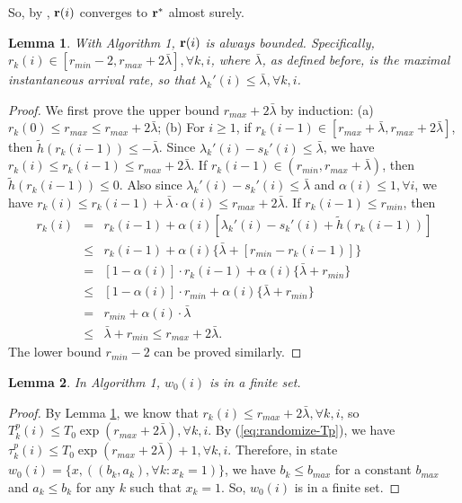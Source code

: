 \documentclass{IEEEtran}
\newtheorem{lemma}{Lemma}
\begin{document}
So, by \cite{Borkar}, ${\bf r}(i)$ converges to ${\bf r}^{*}$ almost
surely.
\begin{lemma}
\label{lem:r-bounded-Algorithm-4}With Algorithm 1, ${\bf r}(i)$
is always bounded. Specifically, $r_{k}(i)\in[r_{min}-2,r_{max}+2\bar{\lambda}],\forall k,i$,
where $\bar{\lambda}$, as defined before, is the maximal instantaneous
arrival rate, so that $\lambda_{k}'(i)\le\bar{\lambda},\forall k,i$. \end{lemma}
\begin{proof}
We first prove the upper bound $r_{max}+2\bar{\lambda}$ by induction:
(a) $r_{k}(0)\le r_{max}\le r_{max}+2\bar{\lambda}$; (b) For $i\ge1$,
if $r_{k}(i-1)\in[r_{max}+\bar{\lambda},r_{max}+2\bar{\lambda}]$,
then $\tilde{h}(r_{k}(i-1))\le-\bar{\lambda}$. Since $\lambda_{k}'(i)-s_{k}'(i)\le\bar{\lambda}$,
we have $r_{k}(i)\le r_{k}(i-1)\le r_{max}+2\bar{\lambda}$. If $r_{k}(i-1)\in(r_{min},r_{max}+\bar{\lambda})$,
then $\tilde{h}(r_{k}(i-1))\le0$. Also since $\lambda_{k}'(i)-s_{k}'(i)\le\bar{\lambda}$
and $\alpha(i)\le1,\forall i$, we have $r_{k}(i)\le r_{k}(i-1)+\bar{\lambda}\cdot\alpha(i)\le r_{max}+2\bar{\lambda}$.
If $r_{k}(i-1)\le r_{min}$, then \begin{eqnarray*}
r_{k}(i) & = & r_{k}(i-1)+\alpha(i)[\lambda_{k}'(i)-s_{k}'(i)+\tilde{h}(r_{k}(i-1))]\\
 & \le & r_{k}(i-1)+\alpha(i)\{\bar{\lambda}+[r_{min}-r_{k}(i-1)]\}\\
 & = & [1-\alpha(i)]\cdot r_{k}(i-1)+\alpha(i)\{\bar{\lambda}+r_{min}\}\\
 & \le & [1-\alpha(i)]\cdot r_{min}+\alpha(i)\{\bar{\lambda}+r_{min}\}\\
 & = & r_{min}+\alpha(i)\cdot\bar{\lambda}\\
 & \le & \bar{\lambda}+r_{min}\le r_{max}+2\bar{\lambda}.\end{eqnarray*}
The lower bound $r_{min}-2$ can be proved similarly. \end{proof}
\begin{lemma}
\label{lem:finite-set}In Algorithm 1, $w_{0}(i)$ is in a finite
set.\end{lemma}
\begin{proof}
By Lemma \ref{lem:r-bounded-Algorithm-4}, we know that $r_{k}(i)\le r_{max}+2\bar{\lambda},\forall k,i$,
so $T_{k}^{p}(i)\le T_{0}\exp(r_{max}+2\bar{\lambda}),\forall k,i$.
By (\ref{eq:randomize-Tp}), we have $\tau_{k}^{p}(i)\le T_{0}\exp(r_{max}+2\bar{\lambda})+1,\forall k,i$.
Therefore, in state $w_{0}(i)=\{x,((b_{k},a_{k}),\forall k:x_{k}=1)\}$,
we have $b_{k}\le b_{max}$ for a constant $b_{max}$ and $a_{k}\le b_{k}$
for any $k$ such that $x_{k}=1$. So, $w_{0}(i)$ is in a finite
set.
\end{proof}
\end{document}
